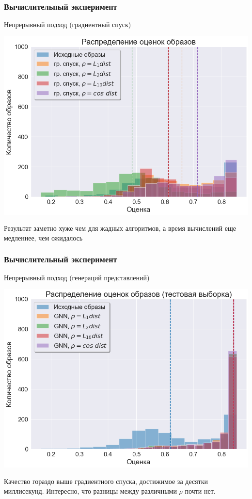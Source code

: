 \documentclass[10pt]{beamer}
\begin{document}
\begin{frame}
	\frametitle{Вычислительный эксперимент}
	\begin{block}{Непрерывный подход (градиентный спуск)}
		\vspace{-0.3cm}
		\begin{center}
			\includegraphics[scale = 0.47]{../figures/backprop_at_least_5_subset1000.png}
		\end{center}
	\end{block}
Результат заметно хуже чем для жадных алгоритмов, а время вычислений еще медленнее, чем ожидалось
\end{frame}

\begin{frame}
	\frametitle{Вычислительный эксперимент}
	\begin{block}{Непрерывный подход (генераций представлений)}
		\vspace{-0.3cm}
		\begin{center}
			\includegraphics[scale = 0.47]{../figures/GNN_at_least_5_subset1000_test.png}
		\end{center}
	\end{block}
	Качество гораздо выше градиентного спуска, достижимое за десятки миллисекунд. Интересно, что разницы между различными $\rho$ почти нет.
\end{frame}
\end{document}
